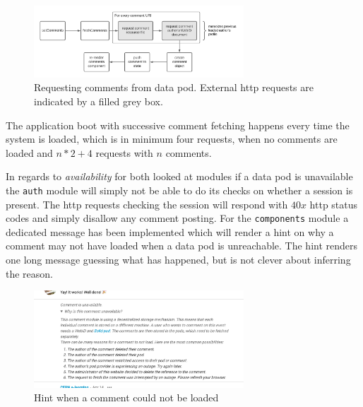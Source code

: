 \begin{figure}[H]
    \centering
    \includegraphics[width=0.7\textwidth]{prototype/graphs/poc-comment-flow-set_comments.png}
    \caption{Requesting comments from data pod. External \gls{http} requests are indicated by a filled grey box.}
    \label{fig:poc-comment-flow-set_comments}
\end{figure}

The application boot with successive comment fetching happens every time the system is loaded, which is in minimum four requests, when no comments are loaded and $n*2+4$ requests with $n$ comments.

In regards to \textit{availability} for both looked at modules if a data pod is unavailable the \texttt{auth} module will simply not be able to do its checks on whether a session is present. The \gls{http} requests checking the session will respond with $40x$ \gls{http} status codes and simply disallow any comment posting. For the \texttt{components} module a dedicated message has been implemented which will render a hint on why a comment may not have loaded when a data pod is unreachable. The hint renders one long message guessing what has happened, but is not clever about inferring the reason.

\begin{figure}[H]
    \centering
    \includegraphics[width=0.7\textwidth]{prototype/poc-comment-unavailable_comment.png}
    \caption{Hint when a comment could not be loaded}
    \label{fig:poc-comment-unavailable_comment}
\end{figure}

